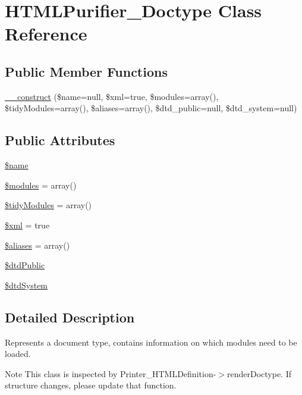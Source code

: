 \hypertarget{classHTMLPurifier__Doctype}{\section{H\+T\+M\+L\+Purifier\+\_\+\+Doctype Class Reference}
\label{classHTMLPurifier__Doctype}
}
\subsection*{Public Member Functions}
\begin{DoxyCompactItemize}
\item 
\hyperlink{classHTMLPurifier__Doctype_ae0a3f82d77cba39cfe702728d63d35a4}{\+\_\+\+\_\+construct} (\$name=null, \$xml=true, \$modules=array(), \$tidy\+Modules=array(), \$aliases=array(), \$dtd\+\_\+public=null, \$dtd\+\_\+system=null)
\end{DoxyCompactItemize}
\subsection*{Public Attributes}
\begin{DoxyCompactItemize}
\item 
\hyperlink{classHTMLPurifier__Doctype_ab1bbc91b5d4bea664707ceb5a21fb80e}{\$name}
\item 
\hyperlink{classHTMLPurifier__Doctype_ac02f91aa55c131c0d047a8e919851eaf}{\$modules} = array()
\item 
\hyperlink{classHTMLPurifier__Doctype_a68201521e368ad87fb91c656a46fc993}{\$tidy\+Modules} = array()
\item 
\hyperlink{classHTMLPurifier__Doctype_aceb157000dffa2942914fdf1de8bf920}{\$xml} = true
\item 
\hyperlink{classHTMLPurifier__Doctype_a18245ce939802ad66cb814cfafde5a99}{\$aliases} = array()
\item 
\hyperlink{classHTMLPurifier__Doctype_a7c09accf36f15025fb9eacdd7d3034e9}{\$dtd\+Public}
\item 
\hyperlink{classHTMLPurifier__Doctype_a06deda0ab96e03bb9fa4dff3c4b28522}{\$dtd\+System}
\end{DoxyCompactItemize}


\subsection{Detailed Description}
Represents a document type, contains information on which modules need to be loaded. \begin{DoxyNote}{Note}
This class is inspected by Printer\+\_\+\+H\+T\+M\+L\+Definition-\/$>$render\+Doctype. If structure changes, please update that function. 
\end{DoxyNote}


